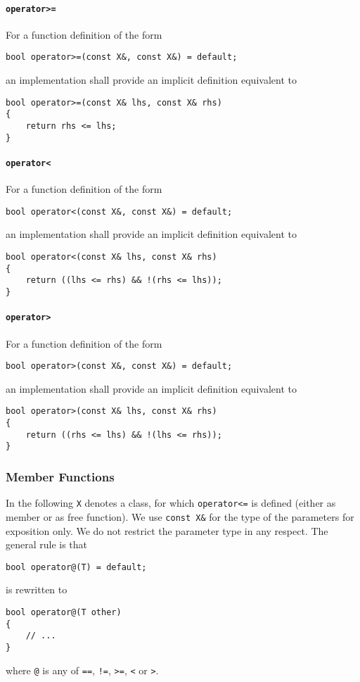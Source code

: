 ﻿\documentclass[a4paper,11pt,final]{article}
\begin{document}
\paragraph{\texttt{operator>=}}
For a function definition of the form
\begin{verbatim}
bool operator>=(const X&, const X&) = default;
\end{verbatim}
an implementation shall provide an implicit definition equivalent to
\begin{verbatim}
bool operator>=(const X& lhs, const X& rhs)
{
    return rhs <= lhs;
}
\end{verbatim}

\paragraph{\texttt{operator<}}
For a function definition of the form
\begin{verbatim}
bool operator<(const X&, const X&) = default;
\end{verbatim}
an implementation shall provide an implicit definition equivalent to
\begin{verbatim}
bool operator<(const X& lhs, const X& rhs)
{
    return ((lhs <= rhs) && !(rhs <= lhs));
}
\end{verbatim}

\paragraph{\texttt{operator>}}
For a function definition of the form
\begin{verbatim}
bool operator>(const X&, const X&) = default;
\end{verbatim}
an implementation shall provide an implicit definition equivalent to
\begin{verbatim}
bool operator>(const X& lhs, const X& rhs)
{
    return ((rhs <= lhs) && !(lhs <= rhs));
}
\end{verbatim}

\subsubsection{Member Functions}
In the following \verb|X| denotes a class, for which \verb|operator<=| is defined (either as member or as free function). We use \verb|const X&| for the type of the parameters for exposition only. We do not restrict the parameter type in any respect. The general rule is that
\begin{verbatim}
bool operator@(T) = default;
\end{verbatim}
is rewritten to
\begin{verbatim}
bool operator@(T other)
{
    // ...
}
\end{verbatim}
where \verb|@| is any of \verb|==|, \verb|!=|, \verb|>=|, \verb|<| or \verb|>|.
\end{document}

